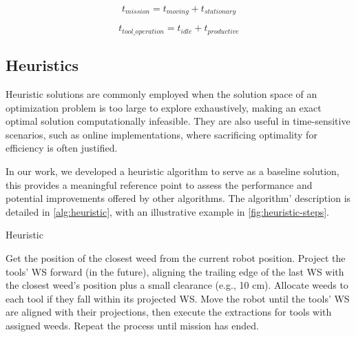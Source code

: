 \begin{equation}
    t_{mission} = t_{moving} + t_{stationary}
\label{eq:total-mission-time}
\end{equation}

\begin{equation}
    t_{tool\_operation} = t_{idle} + t_{productive}
\label{eq:tool-usage-time}
\end{equation}


\subsection{Heuristics}
Heuristic solutions are commonly employed when the solution space of an optimization problem is too large to explore exhaustively, making an exact optimal solution computationally infeasible. They are also useful in time-sensitive scenarios, such as online implementations, where sacrificing optimality for efficiency is often justified.

In our work, we developed a heuristic algorithm to serve as a baseline solution, this provides a meaningful reference point to assess the performance and potential improvements offered by other algorithms. The algorithm' description is detailed in \ref{alg:heuristic}, with an illustrative example in \autoref{fig:heuristic-steps}.

\begin{algorithm}
    \caption{Heuristic}
    \begin{algorithmic}[1]
        \STATE Get the position of the closest weed from the current robot position.  
        \STATE Project the tools' \ac{WS} forward (in the future), aligning the trailing edge of the last \ac{WS} with the closest weed's position plus a small clearance (e.g., 10 cm).  
        \STATE Allocate weeds to each tool if they fall within its projected \ac{WS}.
        \STATE Move the robot until the tools' \ac{WS} are aligned with their projections, then execute the extractions for tools with assigned weeds.  
        \STATE Repeat the process until mission has ended.  
    \end{algorithmic}
    \label{alg:heuristic}
\end{algorithm}

